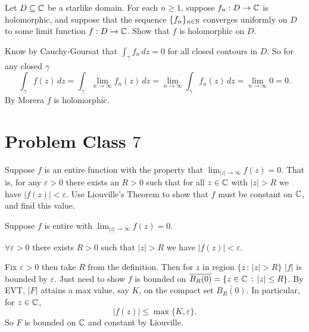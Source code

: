 \documentclass[10pt, a4paper]{article}
\begin{document}
\begin{problem}
    Let $D \subseteq \mathbb{C}$ be a starlike domain.
    For each $n \geq 1$,
    suppose $f_n : D \to \mathbb{C}$ is holomorphic,
    and suppose that the sequence $\{f_n\}_{n \in \mathbb{N}}$ converges uniformly on $D$ to some limit function $f : D \to \mathbb{C}$.
    Show that $f$ is holomorphic on $D$.

    \begin{solution}
        Know by Cauchy-Goursat that $\int_{\gamma} f_n\,dz = 0$ for all closed contours in $D$.
        So for any closed $\gamma$
        \[
        \int_{\gamma}f(z)\,dz = \int_{\gamma}\lim_{n \to \infty}f_n(z)\,dz = \lim_{n \to \infty}\int_{\gamma}f_n(z)\,dz = \lim_{n \to \infty}0 = 0.
        \]
        By Morera $f$ is holomorphic.
    \end{solution}
\end{problem}

\newpage

\section{Problem Class \texorpdfstring{$7$}{}}

\begin{problem}
    Suppose $f$ is an entire function with the property that $\lim_{|z| \to \infty}f(z) = 0$.
    That is,
    for any $\varepsilon > 0$ there exists an $R > 0$ such that for all $z \in \mathbb{C}$ with $|z| > R$ we have $|f(z)| < \varepsilon$.
    Use Liouville's Theorem to show that $f$ must be constant on $\mathbb{C}$,
    and find this value.

    \begin{solution}
        Suppose $f$ is entire with $\lim_{|z| \to \infty}f(z) = 0$.

        $\forall \varepsilon > 0$ there exists $R > 0$ such that $|z| > R$ we have $|f(z)| < \varepsilon$.

        Fix $\varepsilon > 0$ then take $R$ from the definition.
        Then for $z$ in region $\{z\,:\,|z| > R\}$ $|f|$ is bounded by $\varepsilon$.
        Just need to show $f$ is bounded on $\overline{B_{R}(0)} = \{z \in \mathbb{C}\,:\,|z| \leq R\}$.
        By EVT,
        $|F|$ attains a max value,
        say $K$,
        on the compact set $\overline{B_{R}(0)}$.
        In particular,
        for $z \in \mathbb{C}$,
        \[
        |f(z)| \leq \max\{K, \varepsilon\}.
        \]
        So $F$ is bounded on $\mathbb{C}$ and constant by Liouville.
    \end{solution}
\end{problem}
\end{document}
